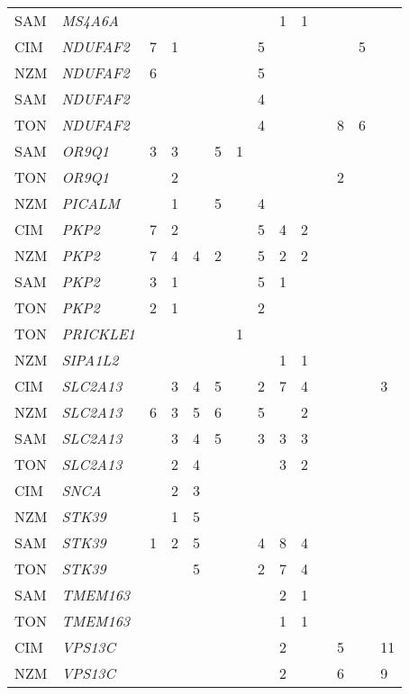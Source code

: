 \documentclass[twoside,openright]{report}
\begin{document}
\begin{ThreePartTable}
\begin{longtable}[t]{llllllllllllll}
SAM & \em{MS4A6A} &  &  &  &  &  &  & 1 & 1 &  &  &  & \\
CIM & \em{NDUFAF2} & 7 & 1 &  &  &  & 5 &  &  &  &  & 5 & \\
NZM & \em{NDUFAF2} & 6 &  &  &  &  & 5 &  &  &  &  &  & \\
SAM & \em{NDUFAF2} &  &  &  &  &  & 4 &  &  &  &  &  & \\
TON & \em{NDUFAF2} &  &  &  &  &  & 4 &  &  &  & 8 & 6 & \\
SAM & \em{OR9Q1} & 3 & 3 &  & 5 & 1 &  &  &  &  &  &  & \\
TON & \em{OR9Q1} &  & 2 &  &  &  &  &  &  &  & 2 &  & \\
NZM & \em{PICALM} &  & 1 &  & 5 &  & 4 &  &  &  &  &  & \\
CIM & \em{PKP2} & 7 & 2 &  &  &  & 5 & 4 & 2 &  &  &  & \\
NZM & \em{PKP2} & 7 & 4 & 4 & 2 &  & 5 & 2 & 2 &  &  &  & \\
SAM & \em{PKP2} & 3 & 1 &  &  &  & 5 & 1 &  &  &  &  & \\
TON & \em{PKP2} & 2 & 1 &  &  &  & 2 &  &  &  &  &  & \\
TON & \em{PRICKLE1} &  &  &  &  & 1 &  &  &  &  &  &  & \\
NZM & \em{SIPA1L2} &  &  &  &  &  &  & 1 & 1 &  &  &  & \\
CIM & \em{SLC2A13} &  & 3 & 4 & 5 &  & 2 & 7 & 4 &  &  &  & 3\\
NZM & \em{SLC2A13} & 6 & 3 & 5 & 6 &  & 5 &  & 2 &  &  &  & \\
SAM & \em{SLC2A13} &  & 3 & 4 & 5 &  & 3 & 3 & 3 &  &  &  & \\
TON & \em{SLC2A13} &  & 2 & 4 &  &  &  & 3 & 2 &  &  &  & \\
CIM & \em{SNCA} &  & 2 & 3 &  &  &  &  &  &  &  &  & \\
NZM & \em{STK39} &  & 1 & 5 &  &  &  &  &  &  &  &  & \\
SAM & \em{STK39} & 1 & 2 & 5 &  &  & 4 & 8 & 4 &  &  &  & \\
TON & \em{STK39} &  &  & 5 &  &  & 2 & 7 & 4 &  &  &  & \\
SAM & \em{TMEM163} &  &  &  &  &  &  & 2 & 1 &  &  &  & \\
TON & \em{TMEM163} &  &  &  &  &  &  & 1 & 1 &  &  &  & \\
CIM & \em{VPS13C} &  &  &  &  &  &  & 2 &  &  & 5 &  & 11\\
NZM & \em{VPS13C} &  &  &  &  &  &  & 2 &  &  & 6 &  & 9\\*
\end{longtable}
\end{ThreePartTable}
\end{document}
